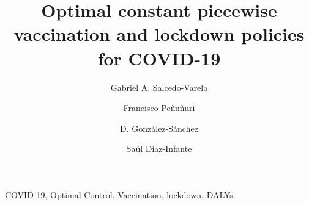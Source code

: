 \begin{frontmatter}
    \title{
        Optimal constant piecewise vaccination and lockdown
        policies for COVID-19
    }
    \author[add:unison]%
    {Gabriel A. Salcedo-Varela
    }
    \address[add:unison]{
        Departamento de Matem\'aticas, Universidad de Sonora,
        Blvd. Luis Encinas y Rosales S/N,
        Hermosillo, Sonora, M\'exico, C.P. 83000.
    }
    \author[add:UADY]%
    {Francisco Pe\~nu\~nuri}
    \address[add:UADY]{Facultad de Ingenier\'ia, Universidad
    Aut\'onoma de Yucat\'an, A.P. 150, Cordemex, M\'erida, Yucat\'an,
    M\'exico.}
    \author[add:conacyt_unison]{D. Gonz\'alez-S\'anchez}
        \address[add:conacyt_unison]{
        CONACYT-Universidad de Sonora,
        Departamento de Matem\'aticas,
        Blvd. Luis Encinas y Rosales S/N,
        Hermosillo, Sonora, M\'exico, C.P. 83000.
    }
    \author[add:conacyt_unison]{%
        Sa\'ul D\'iaz-Infante%
    }%
    \begin{keyword}
        COVID-19, Optimal Control,
        Vaccination, lockdown, DALYs.
    \end{keyword}
    
\end{frontmatter}